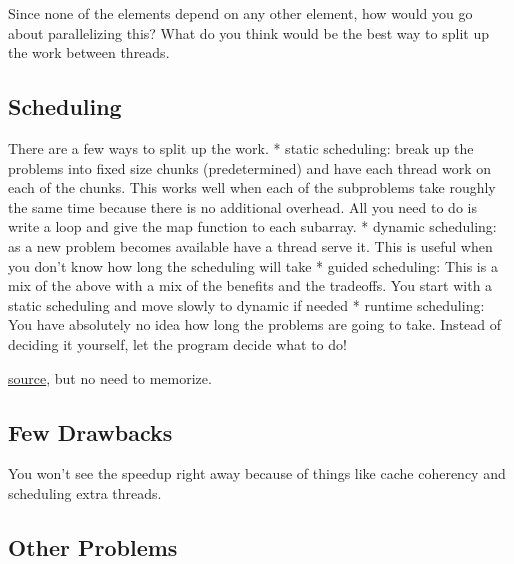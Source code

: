 Since none of the elements depend on any other element, how would you go
about parallelizing this? What do you think would be the best way to
split up the work between threads.

\subsection{Scheduling}\label{scheduling}

There are a few ways to split up the work. * static scheduling: break up
the problems into fixed size chunks (predetermined) and have each thread
work on each of the chunks. This works well when each of the subproblems
take roughly the same time because there is no additional overhead. All
you need to do is write a loop and give the map function to each
subarray. * dynamic scheduling: as a new problem becomes available have
a thread serve it. This is useful when you don't know how long the
scheduling will take * guided scheduling: This is a mix of the above
with a mix of the benefits and the tradeoffs. You start with a static
scheduling and move slowly to dynamic if needed * runtime scheduling:
You have absolutely no idea how long the problems are going to take.
Instead of deciding it yourself, let the program decide what to do!

\href{https://software.intel.com/en-us/articles/openmp-loop-scheduling}{source},
but no need to memorize.

\subsection{Few Drawbacks}\label{few-drawbacks}

You won't see the speedup right away because of things like cache
coherency and scheduling extra threads.

\subsection{Other Problems}\label{other-problems}

